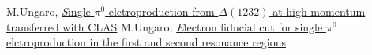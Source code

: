 \begin{thebibliography}{mybib}
                           {M.Ungaro},  \href{https://maureeungaro.github.io/home/meson/pi0_delta/pi0_delta}       {\textit Single $\pi^0$ elctroproduction from $\Delta(1232)$ at high momentum transferred with CLAS}
     {M.Ungaro},  \href{https://maureeungaro.github.io/home/meson/pi0_resonance/electron_fid}{\textit Electron fiducial cut for single $\pi^0$ elctroproduction in the first and second resonance regions}
\end{thebibliography}
